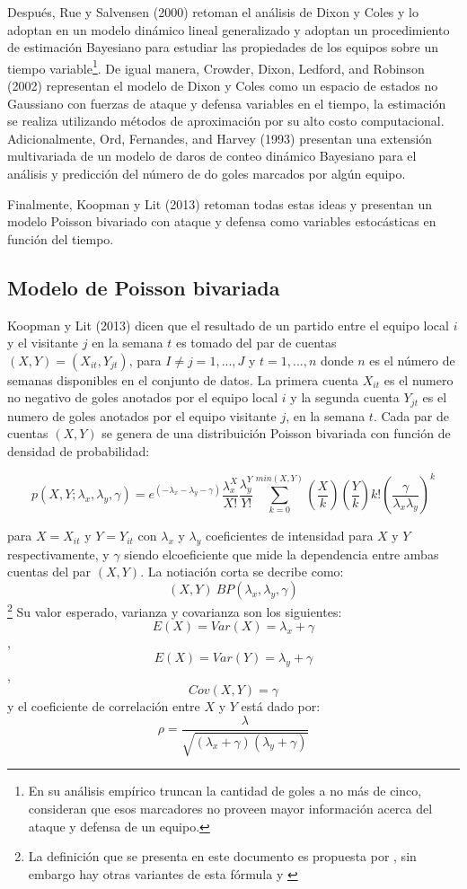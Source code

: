 Después, Rue y Salvensen (2000) \cite{rue2000prediction} retoman el análisis de Dixon y Coles \cite{dixon1997modelling} y lo adoptan en un modelo dinámico lineal generalizado y adoptan un procedimiento de estimación Bayesiano para estudiar las propiedades de los equipos sobre un tiempo variable\footnote{En su análisis empírico truncan la cantidad de goles a no más de cinco, consideran que esos marcadores no proveen mayor información acerca del ataque y defensa de un equipo.}. De igual manera, Crowder, Dixon, Ledford, and Robinson (2002) \cite{crowder2002dynamic} representan el modelo de Dixon y Coles \cite{dixon1997modelling} como un espacio de estados no Gaussiano con fuerzas de ataque y defensa variables en el tiempo, la estimación se realiza utilizando métodos de aproximación por su alto costo computacional. Adicionalmente, Ord, Fernandes, and Harvey (1993) \cite{ord1993time} presentan una extensión multivariada de un modelo de daros de conteo dinámico Bayesiano para el análisis y predicción del número de do goles marcados por algún equipo.

Finalmente, Koopman y Lit (2013) \cite{koopman2013dynamic} retoman todas estas ideas y presentan un modelo Poisson bivariado con ataque y defensa como variables estocásticas en función del tiempo. 
\subsection{Modelo de Poisson bivariada}
\label{subsec:bivariate-poisson}

Koopman y Lit (2013) \cite{koopman2013dynamic} dicen que el resultado de un partido entre el equipo local $i$ y el visitante $j$ en la semana $t$ es tomado del par de cuentas $(X,Y) = (X_{it},Y_{jt})$, para $I\neq j = 1, ...,J$ y $t=1,...,n$ donde $n$ es el número de semanas disponibles en el conjunto de datos. La primera cuenta $X_{it}$ es el numero no negativo de goles anotados por el equipo local $i$ y la segunda cuenta $Y_{jt}$ es el numero de goles anotados por el equipo visitante $j$, en la semana $t$. Cada par de cuentas $(X,Y)$ se genera de una distribuición Poisson bivariada con función de densidad de probabilidad:
 
\[p(X,Y;\lambda_x,\lambda_y,\gamma) = e^{(-\lambda_x-\lambda_y-\gamma)}\frac{\lambda^X_x}{X!}\frac{\lambda^Y_y}{Y!}\sum_{k=0}^{min(X,Y)}\left(\frac{X}{k}\right)\left(\frac{Y}{k}\right)k!\left(\frac{\gamma}{\lambda_x\lambda_y}\right)^k \]

para $X = X_{it}$ y $Y = Y_{it}$ con $\lambda_x$ y $\lambda_y$ coeficientes de intensidad para $X$ y $Y$ respectivamente, y $\gamma$ siendo elcoeficiente que mide la dependencia entre ambas cuentas del par $(X,Y)$. La notiación corta se decribe como:
\[(X,Y) ~ BP(\lambda_x,\lambda_y,\gamma)\]\footnote{La definición que se presenta en este documento es propuesta por \cite{koopman2013dynamic}, sin embargo hay otras variantes de esta fórmula \cite{kocherlakota1992bivariate} y \cite{johnson1997discrete}}
Su valor esperado, varianza y covarianza son los siguientes:
\[E(X) = Var(X) = \lambda_x + \gamma\], \[E(X) = Var(Y) = \lambda_y + \gamma\], \[Cov(X,Y) = \gamma\]
y el coeficiente de correlación entre $X$ y $Y$ está dado por:
\[\rho = \frac{\lambda}{\sqrt{(\lambda_x+\gamma)(\lambda_y+\gamma)}}\]


